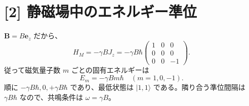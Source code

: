 \documentclass[11pt,a4paper]{article}
\begin{document}
\section*{[2] 静磁場中のエネルギー準位}
$\boldsymbol{B}=B\boldsymbol{e}_z$ だから、
\begin{equation}
  H_M=-\gamma BJ_z
  =-\gamma B\hbar
  \begin{pmatrix}1&0&0\\0&0&0\\0&0&-1\end{pmatrix}.
\end{equation}
従って磁気量子数 $m$ ごとの固有エネルギーは
\begin{equation}
  \boxed{E_m=-\gamma Bm\hbar\quad(m=1,0,-1)}.
\end{equation}
順に $-\gamma B\hbar,0,+\gamma B\hbar$ であり、最低状態は $|1,1\rangle$ である。隣り合う準位間隔は $\gamma B\hbar$ なので、共鳴条件は $\omega=\gamma B$。
\end{document}
